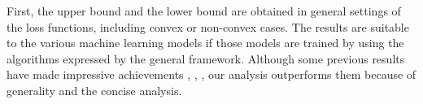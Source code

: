 \documentclass[letterpaper]{article}
\begin{document}

First, the upper bound and the lower bound are obtained in general settings of the loss functions, including convex or non-convex cases. The results are suitable to the various machine learning models if those models are trained by using the algorithms expressed by the general framework. Although some previous results  have made  impressive achievements \cite{ShalevShwartz:2016vy}, \cite{Garber:2015td}, \cite{AllenZhu:2016up}, our analysis outperforms them because of generality and the concise analysis. 
\end{document}
